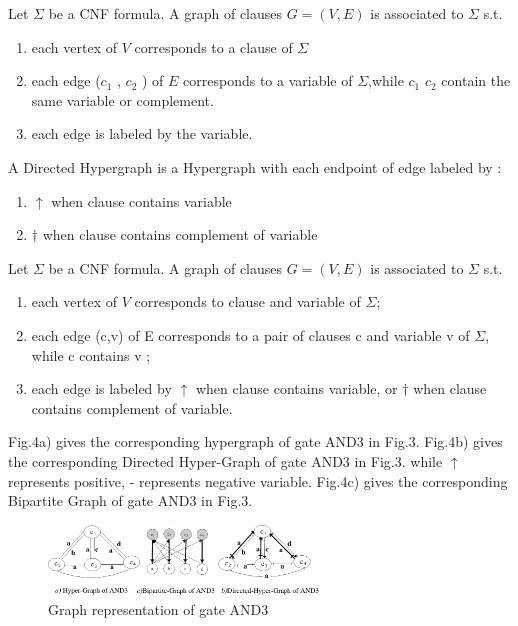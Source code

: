 \documentclass[runningheads,a4paper]{llncs}
\begin{document}
\begin{definition}
Let $\Sigma$ be a CNF formula. A graph of clauses $G=(V,E)$ is associated to $\Sigma$ s.t.
\begin{enumerate}
 \item each vertex of $V$ corresponds to a clause of  $\Sigma$
 \item each edge ($c_1$ , $c_2$ ) of $E$ corresponds to a variable of $\Sigma$,while $c_1$ $c_2$ contain the same variable or complement.
 \item each edge is labeled by the variable.
\end{enumerate}
\end{definition}


 \begin{definition}
A Directed Hypergraph is a Hypergraph with each endpoint of edge labeled by :
\begin{enumerate}
 \item $\uparrow$ when clause contains variable 
 \item $\dag$ when clause contains complement of variable
\end{enumerate}
\end{definition}


 \begin{definition}
 Let $\Sigma$ be a CNF formula. A graph of clauses $G=(V,E)$ is associated to $\Sigma$ s.t.
\begin{enumerate}
 \item each vertex of $V$ corresponds to clause and variable of $\Sigma$;
 \item each edge (c,v) of E corresponds to a pair of clauses c and variable v of $\Sigma$, while c contains v ;
 \item each edge is labeled by  $\uparrow$  when clause contains variable, or
$\dag$ when clause contains complement of variable.
\end{enumerate}
\end{definition}


Fig.4a) gives the corresponding hypergraph of gate AND3 in Fig.3. 
Fig.4b) gives the corresponding Directed Hyper-Graph of gate AND3 in Fig.3. while $\uparrow$ represents positive, - represents negative variable.
Fig.4c) gives the corresponding Bipartite Graph of gate AND3 in Fig.3.
\begin{figure}
\centering
\includegraphics[width=7.2cm]{a4}
\caption{Graph representation of gate AND3}
\end{figure}
\end{document}
